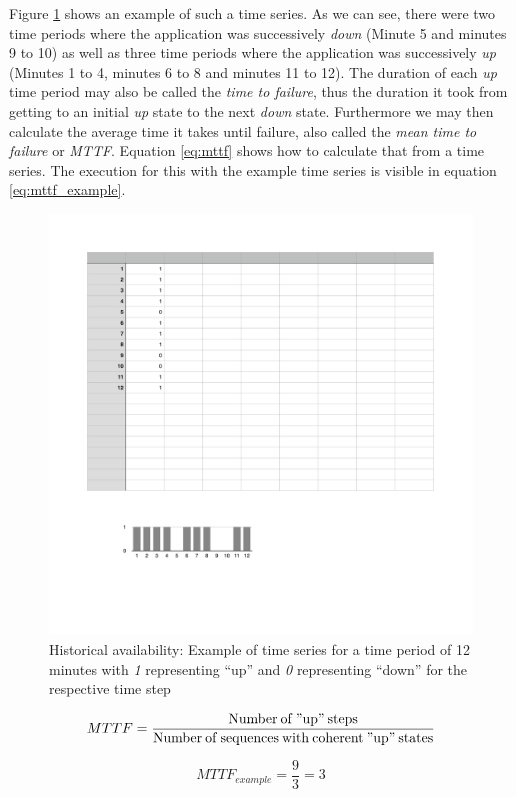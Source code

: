 Figure \ref{fig:availability_timeseries} shows an example of such a time series. As we can see, there were two time periods where the application was successively \emph{down} (Minute 5 and minutes 9 to 10) as well as three time periods where the application was successively \emph{up} (Minutes 1 to 4, minutes 6 to 8 and minutes 11 to 12). The duration of each \emph{up} time period may also be called the \emph{time to failure}, thus the duration it took from getting to an initial \emph{up} state to the next \emph{down} state. Furthermore we may then calculate the average time it takes until failure, also called the \emph{mean time to failure} or \emph{MTTF}. Equation \ref{eq:mttf} shows how to calculate that from a time series. The execution for this with the example time series is visible in equation \ref{eq:mttf_example}.

\begin{figure}[ht]
  \centering
  \includegraphics[width=0.7\columnwidth] {images/availability_timeseries.pdf}
  \caption{Historical availability: Example of time series for a time period of 12 minutes with \emph{1} representing ``up'' and \emph{0} representing ``down'' for the respective time step}
  \label{fig:availability_timeseries}
\end{figure}

\begin{equation} \label{eq:mttf}
  MTTF = \frac{\operatorname{Number\:of\:"up"\:steps}}{\operatorname{Number\:of\:sequences\:with\:coherent\:"up"\:states}}
\end{equation}

\begin{equation} \label{eq:mttf_example}
  MTTF_{example} = \frac{9}{3} = 3
\end{equation}

